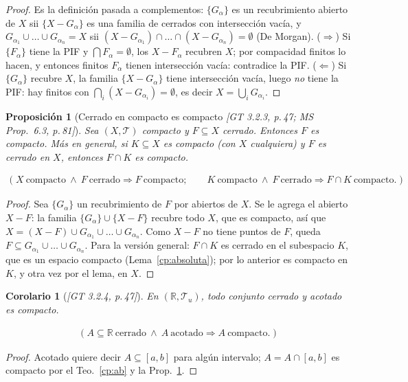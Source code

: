 \documentclass[11pt,a4paper]{article}
\newcommand{\lgc}[1]{\par\vspace{-3pt}\begin{gather*}\big(\;#1\;\big)\end{gather*}\vspace{-6pt}}
\theoremstyle{definition}
\theoremstyle{plain}
\newtheorem{proposicion}[definicion]{Proposición}
\newtheorem{corolario}[definicion]{Corolario}
\newcommand{\fnt}[1]{{\normalfont\small\itshape\color{gray!150!black}[#1]}}
\newcommand{\R}{\mathbb{R}}
\newcommand{\tp}{\mathcal{T}}
\begin{document}
\begin{proof}
Es la definición pasada a complementos: $\{G_\alpha\}$ es un recubrimiento abierto de $X$ sii $\{X-G_\alpha\}$ es una familia de cerrados con intersección vacía, y $G_{\alpha_1}\cup\dots\cup G_{\alpha_n}=X$ sii $(X-G_{\alpha_1})\cap\dots\cap(X-G_{\alpha_n})=\emptyset$ (De Morgan). ($\Rightarrow$) Si $\{F_\alpha\}$ tiene la PIF y $\bigcap F_\alpha=\emptyset$, los $X-F_\alpha$ recubren $X$; por compacidad finitos lo hacen, y entonces finitos $F_\alpha$ tienen intersección vacía: contradice la PIF. ($\Leftarrow$) Si $\{G_\alpha\}$ recubre $X$, la familia $\{X-G_\alpha\}$ tiene intersección vacía, luego \emph{no} tiene la PIF: hay finitos con $\bigcap_i(X-G_{\alpha_i})=\emptyset$, es decir $X=\bigcup_iG_{\alpha_i}$.
\end{proof}

\begin{proposicion}[Cerrado en compacto es compacto \fnt{GT 3.2.3, p.\,47; MS Prop.\ 6.3, p.\,81}]\label{cp:cerrcomp}
Sea $(X,\tp)$ compacto y $F\subseteq X$ cerrado. Entonces $F$ es compacto. Más en general, si $K\subseteq X$ es compacto (con $X$ cualquiera) y $F$ es cerrado en $X$, entonces $F\cap K$ es compacto.
\lgc{X\ \text{compacto}\ \wedge\ F\ \text{cerrado}\Rightarrow F\ \text{compacto};\qquad K\ \text{compacto}\ \wedge\ F\ \text{cerrado}\Rightarrow F\cap K\ \text{compacto}.}
\end{proposicion}

\begin{proof}
Sea $\{G_\alpha\}$ un recubrimiento de $F$ por abiertos de $X$. Se le agrega el abierto $X-F$: la familia $\{G_\alpha\}\cup\{X-F\}$ recubre todo $X$, que es compacto, así que $X=(X-F)\cup G_{\alpha_1}\cup\dots\cup G_{\alpha_n}$. Como $X-F$ no tiene puntos de $F$, queda $F\subseteq G_{\alpha_1}\cup\dots\cup G_{\alpha_n}$.
Para la versión general: $F\cap K$ es cerrado en el subespacio $K$, que es un espacio compacto (Lema~\ref{cp:absoluta}); por lo anterior es compacto en $K$, y otra vez por el lema, en $X$.
\end{proof}

\begin{corolario}[\fnt{GT 3.2.4, p.\,47}]\label{cp:cerracR}
En $(\R,\tp_u)$, todo conjunto cerrado y acotado es compacto.
\lgc{A\subseteq\R\ \text{cerrado}\ \wedge\ A\ \text{acotado}\Rightarrow A\ \text{compacto}.}
\end{corolario}

\begin{proof}
Acotado quiere decir $A\subseteq[a,b]$ para algún intervalo; $A=A\cap[a,b]$ es compacto por el Teo.~\ref{cp:ab} y la Prop.~\ref{cp:cerrcomp}.
\end{proof}
\end{document}

